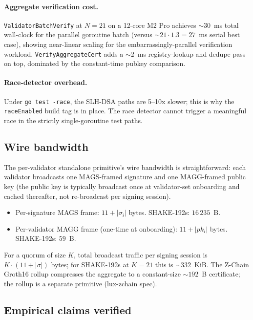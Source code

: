 \paragraph{Aggregate verification cost.}
\texttt{ValidatorBatchVerify} at $N = 21$ on a 12-core M2 Pro
achieves $\sim 30$~ms total wall-clock for the parallel goroutine
batch (versus $\sim 21 \cdot 1.3 = 27$~ms serial best case),
showing near-linear scaling for the embarrassingly-parallel
verification workload. \texttt{VerifyAggregateCert} adds a
$\sim 2$~ms registry-lookup and dedupe pass on top, dominated by
the constant-time pubkey comparison.

\paragraph{Race-detector overhead.} Under \texttt{go test -race},
the SLH-DSA paths are 5--10x slower; this is why the
\texttt{raceEnabled} build tag is in place. The race detector
cannot trigger a meaningful race in the strictly single-goroutine
test paths.

\subsection{Wire bandwidth}
\label{sec:eval:bandwidth}

The per-validator standalone primitive's wire bandwidth is
straightforward: each validator broadcasts one MAGS-framed
signature and one MAGG-framed public key (the public key is
typically broadcast once at validator-set onboarding and cached
thereafter, not re-broadcast per signing session).
\begin{itemize}[leftmargin=2em,nosep]
  \item Per-signature MAGS frame: $11 + |\sigma_i|$ bytes.
        SHAKE-192s: $16\,235$~B.
  \item Per-validator MAGG frame (one-time at onboarding):
        $11 + |pk_i|$ bytes. SHAKE-192s: $59$~B.
\end{itemize}
For a quorum of size $K$, total broadcast traffic per signing
session is $K \cdot (11 + |\sigma|)$ bytes; for SHAKE-192s at
$K=21$ this is $\sim 332$~KiB. The Z-Chain Groth16 rollup
compresses the aggregate to a constant-size $\sim 192$~B
certificate; the rollup is a separate primitive (lux-zchain spec).

\subsection{Empirical claims verified}
\label{sec:eval:tests}

